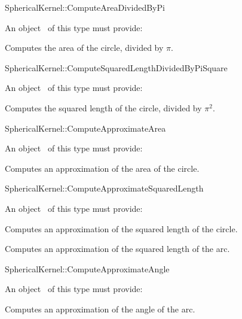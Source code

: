 \begin{ccRefFunctionObjectConcept}{SphericalKernel::ComputeAreaDividedByPi}

An object \ccVar\ of this type must provide:

{Computes the area of the circle, divided by $\pi$.}

\end{ccRefFunctionObjectConcept}
\begin{ccRefFunctionObjectConcept}{SphericalKernel::ComputeSquaredLengthDividedByPiSquare}

An object \ccVar\ of this type must provide:

{Computes the squared length of the circle, divided by $\pi^2$.}

\end{ccRefFunctionObjectConcept}
\begin{ccRefFunctionObjectConcept}{SphericalKernel::ComputeApproximateArea}

An object \ccVar\ of this type must provide:

{Computes an approximation of the area of the circle.}

\end{ccRefFunctionObjectConcept}
\begin{ccRefFunctionObjectConcept}{SphericalKernel::ComputeApproximateSquaredLength}

An object \ccVar\ of this type must provide:

{Computes an approximation of the squared length of the circle.}

{Computes an approximation of the squared length of the arc.}

\end{ccRefFunctionObjectConcept}
\begin{ccRefFunctionObjectConcept}{SphericalKernel::ComputeApproximateAngle}

An object \ccVar\ of this type must provide:

{Computes an approximation of the angle of the arc.}

\end{ccRefFunctionObjectConcept}
